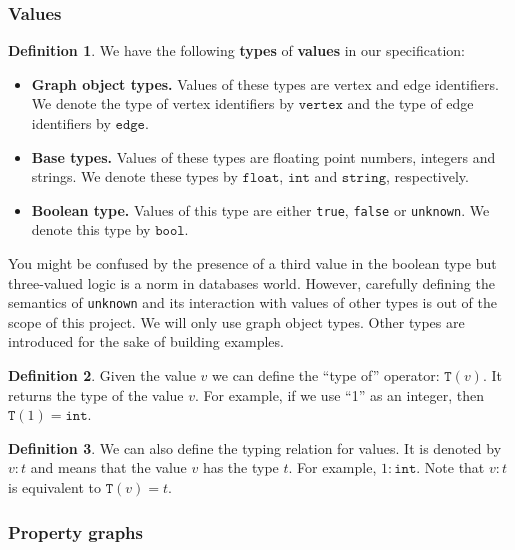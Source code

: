 \documentclass[14pt]{constructor-thesis}
\theoremstyle{definition}
\newtheorem{definition}{Definition}
\begin{document}
\subsubsection{Values}
\label{sec:GQL-values}

\begin{definition}
  We have the following \textbf{types} of \textbf{values} in our specification:
  \begin{itemize}
    \item \textbf{Graph object types.} Values of these types are vertex and edge identifiers. We denote the type of vertex identifiers by $\mathtt{vertex}$ and the type of edge identifiers by $\mathtt{edge}$.
    \item \textbf{Base types.} Values of these types are floating point numbers, integers and strings. We denote these types by $\mathtt{float}$, $\mathtt{int}$ and $\mathtt{string}$, respectively.
    \item \textbf{Boolean type.} Values of this type are either \texttt{true}, \texttt{false} or \texttt{unknown}. We denote this type by $\mathtt{bool}$.
  \end{itemize}
\end{definition}

You might be confused by the presence of a third value in the boolean type but three-valued logic is a norm in databases world. However, carefully defining the semantics of \texttt{unknown} and its interaction with values of other types is out of the scope of this project. We will only use graph object types. Other types are introduced for the sake of building examples.

\begin{definition}
  Given the value $v$ we can define the ``type of'' operator: $\mathtt{T}(v)$. It returns the type of the value $v$. For example, if we use ``1'' as an integer, then $\mathtt{T}(1) = \mathtt{int}$.
\end{definition}

\begin{definition}
  We can also define the typing relation for values. It is denoted by $v : t$ and means that the value $v$ has the type $t$. For example, $1 : \mathtt{int}$. Note that $v : t$ is equivalent to $\mathtt{T}(v) = t$.
\end{definition}

\subsubsection{Property graphs}
\end{document}
